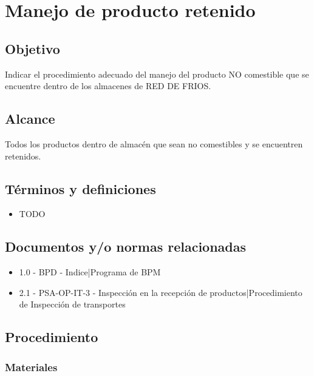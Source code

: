 \renewcommand{\MayorVer}{2}
\renewcommand{\MenorVer}{1}
\renewcommand{\Codigo}{PSA-1-PROG} %
\renewcommand{\FechaPub}{2023--01}
\renewcommand{\Titulo}{Manejo de producto retenido}

\section{\Titulo}


\subsection{Objetivo}

Indicar el procedimiento adecuado del manejo del producto NO comestible que se encuentre dentro de los almacenes de RED DE FRIOS.

\subsection{Alcance}

Todos los productos dentro de almacén que sean no comestibles y se encuentren retenidos.

\subsection{Términos y definiciones}

\begin{itemize}
	\item TODO
\end{itemize}

\subsection{Documentos y/o normas relacionadas}

\begin{itemize}
	\item 1.0 - BPD - Indice|Programa de BPM
	\item 2.1 - PSA-OP-IT-3 - Inspección en la recepción de productos|Procedimiento de Inspección de transportes
\end{itemize}

\subsection{Procedimiento}

\subsubsection{Materiales}


